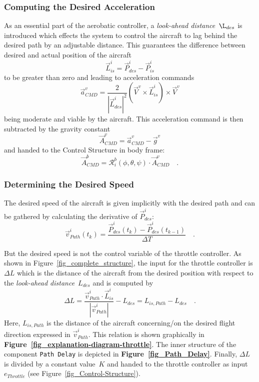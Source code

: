 \documentclass[11pt,a4paper]{scrartcl}		%
\begin{document}
\subsubsection*{Computing the Desired Acceleration}

As an essential part of the aerobatic controller, a \textsl{look-ahead distance}~$\L_{des}$ is introduced which effects the system to control the aircraft to lag behind the desired path by an adjustable distance.
This guarantees the difference between desired and actual position of the aircraft 
\begin{equation}
\vec{L}_{is}^i = \vec{P}_{des}^i - \vec{P}_{is}^i
\end{equation}
to be greater than zero and leading to acceleration commands 
\begin{equation}
\vec{a}_{CMD}^v = \frac{2}{|\vec{L}_{des}^i|^2}\left(\vec{V}^v \times \vec{L}_{is}^i \right) \times \vec{V}^v
\end{equation}
being moderate and viable by the aircraft.
This acceleration command is then subtracted by the gravity constant
\begin{equation}
\vec{A}_{CMD}^v = \vec{a}_{CMD}^v - \vec{g}^v
\end{equation}
and handed to the Control Structure in body frame:
\begin{equation}
\vec{A}_{CMD}^b = \mathcal{R}_i^b(\phi,\theta,\psi) \cdot \vec{A}_{CMD}^v \quad .
\end{equation}

\medskip




\subsubsection*{Determining the Desired Speed}\label{ch-Determ-Desired-Speed}

The desired speed of the aircraft is given implicitly with the desired path and can be gathered by calculating the derivative of $\vec{P}_{des}^i$:
\begin{equation}
\vec{v}_{Path}^i(t_k) = \frac{\vec{P}_{des}^i(t_k)-\vec{P}_{des}^i(t_{k-1})}{\Delta T}\quad .
\end{equation}

But the desired speed is not the control variable of the throttle controller. As shown in Figure~\ref{fig_complete_structure}, the input for the throttle controller is $\Delta L$ which is the distance of the aircraft from the desired position with respect to the \textsl{look-ahead distance}~$L_{des}$ and is computed by
\begin{equation}
\Delta L = \frac{\vec{v}_{Path}^i \cdot \vec{L}_{is}^i}{|\vec{v}_{Path}^i|}-L_{des} = L_{is,Path}-L_{des} \quad .
\end{equation}
Here, $L_{is,Path}$ is the distance of the aircraft concerning/on the desired flight direction expressed in $\vec{v}_{Path}^i$.
This relation is shown graphically in \textbf{Figure~\ref{fig_explanation-diagram-throttle}}. The inner structure of the component \texttt{Path Delay} is depicted in \textbf{Figure~\ref{fig_Path_Delay}}.
Finally, $\Delta L$ is divided by a constant value~$K$ and handed to the throttle controller as input $e_{Throttle}$ (see Figure~\ref{fig_Control-Structure}).
\end{document}
